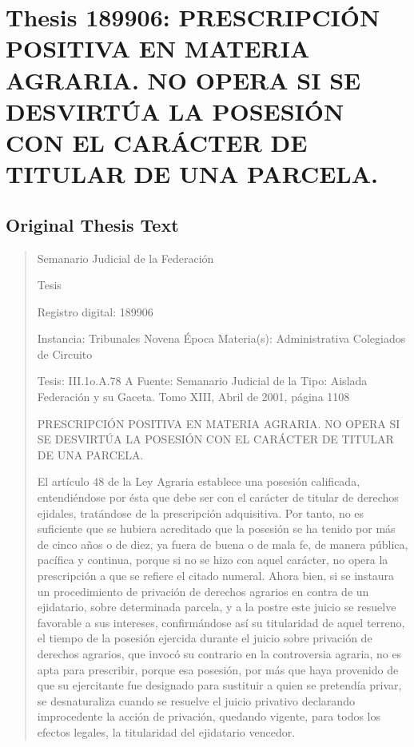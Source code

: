 \documentclass[11pt,a4paper]{article}
\begin{document}
\newpage

\section{Thesis 189906: PRESCRIPCIÓN POSITIVA EN MATERIA AGRARIA. NO OPERA SI SE DESVIRTÚA LA POSESIÓN CON EL CARÁCTER DE TITULAR DE UNA PARCELA.}
\label{thesis:189906}

\subsection{Original Thesis Text}

\begin{quote}
                                                   Semanario Judicial de la Federación

                                                  Tesis

 Registro digital: 189906

 Instancia: Tribunales             Novena Época                           Materia(s): Administrativa
 Colegiados de Circuito

 Tesis: III.1o.A.78 A              Fuente: Semanario Judicial de la       Tipo: Aislada
                                   Federación y su Gaceta.
                                   Tomo XIII, Abril de 2001, página
                                   1108


PRESCRIPCIÓN POSITIVA EN MATERIA AGRARIA. NO OPERA SI SE DESVIRTÚA LA
POSESIÓN CON EL CARÁCTER DE TITULAR DE UNA PARCELA.


El artículo 48 de la Ley Agraria establece una posesión calificada, entendiéndose por ésta que debe
ser con el carácter de titular de derechos ejidales, tratándose de la prescripción adquisitiva. Por
tanto, no es suficiente que se hubiera acreditado que la posesión se ha tenido por más de cinco
años o de diez, ya fuera de buena o de mala fe, de manera pública, pacífica y continua, porque si no
se hizo con aquel carácter, no opera la prescripción a que se refiere el citado numeral. Ahora bien,
si se instaura un procedimiento de privación de derechos agrarios en contra de un ejidatario, sobre
determinada parcela, y a la postre este juicio se resuelve favorable a sus intereses, confirmándose
así su titularidad de aquel terreno, el tiempo de la posesión ejercida durante el juicio sobre privación
de derechos agrarios, que invocó su contrario en la controversia agraria, no es apta para prescribir,
porque esa posesión, por más que haya provenido de que su ejercitante fue designado para
sustituir a quien se pretendía privar, se desnaturaliza cuando se resuelve el juicio privativo
declarando improcedente la acción de privación, quedando vigente, para todos los efectos legales,
la titularidad del ejidatario vencedor.


\end{quote}
\end{document}

